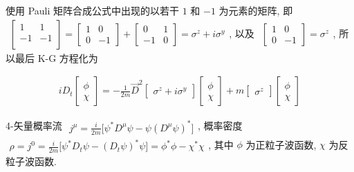 \documentclass[../../main.tex]{subfiles}
\begin{document}
使用 Pauli 矩阵合成公式中出现的以若干 $1$ 和 $-1$ 为元素的矩阵, 即 $\begin{aligned}
    \begin{bmatrix}
        1 & 1\\
        -1 & -1\\
    \end{bmatrix} = \begin{bmatrix}
        1 & 0\\
        0 & -1
    \end{bmatrix} + \begin{bmatrix}
        0 & 1\\
        -1 & 0
    \end{bmatrix} = \sigma^{z} + i\sigma^{y}
\end{aligned}$, 以及 $\begin{aligned}
    \begin{bmatrix}
        1 & 0\\
        0 & -1
    \end{bmatrix} = \sigma^{z}
\end{aligned}$, 所以最后 K-G 方程化为

\begin{align*}
    iD_{t}\begin{bmatrix}
        \phi\\
        \chi
    \end{bmatrix} = -\frac{1}{2m}\vec{D}^{2}\begin{bmatrix}
        \sigma^{z} + i\sigma^{y}
    \end{bmatrix}\begin{bmatrix}
        \phi\\
        \chi
    \end{bmatrix} + m\begin{bmatrix}
        \sigma^{z}
    \end{bmatrix}\begin{bmatrix}
        \phi\\
        \chi
    \end{bmatrix}
\end{align*}

4-矢量概率流 $\begin{aligned}
    j^{\mu} = \frac{i}{2m}\bigg[\psi^{*}D^{\mu}\psi - \psi(D^{\mu}\psi)^{*}\bigg]
\end{aligned}$, 
概率密度 $\begin{aligned}
    \rho = j^{0} = \frac{i}{2m}\bigg[\psi^{*}D_{t}\psi - (D_{t}\psi)^{*}\psi\bigg] = \phi^{*}\phi - \chi^{*}\chi
\end{aligned}$, 其中 $\phi$ 为正粒子波函数, $\chi$ 为反粒子波函数.
\end{document}
